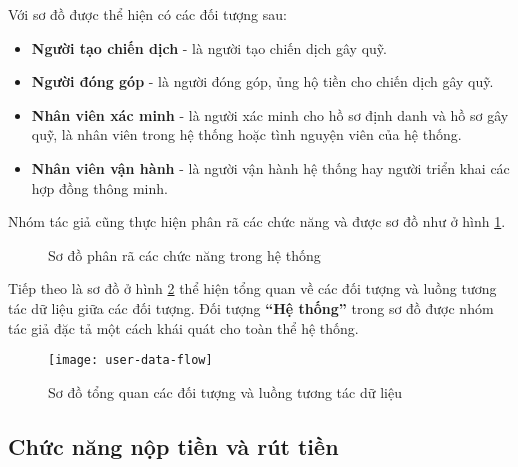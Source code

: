 \documentclass[../main-report.tex]{subfiles}
\begin{document}
Với sơ đồ được thể hiện có các đối tượng sau:

\begin{itemize}
\item \textbf{Người tạo chiến dịch} - là người tạo chiến dịch gây quỹ.
\item \textbf{Người đóng góp} - là người đóng góp, ủng hộ tiền cho chiến dịch gây quỹ.
\item \textbf{Nhân viên xác minh} - là người xác minh cho hồ sơ định danh và hồ sơ gây quỹ, là nhân viên trong hệ thống hoặc tình nguyện viên của hệ thống.
\item \textbf{Nhân viên vận hành} - là người vận hành hệ thống hay người triển khai các hợp đồng thông minh.
\end{itemize}

Nhóm tác giả cũng thực hiện phân rã các chức năng và được sơ đồ như ở hình \ref{fig:function-tree}.

\begin{figure}[ht!]
\begin{center}
\label{fig:function-tree}
\caption{Sơ đồ phân rã các chức năng trong hệ thống}
\end{center}
\end{figure}

Tiếp theo là sơ đồ ở hình \ref{fig:user-data-flow} thể hiện tổng quan về các đối tượng và luồng tương tác dữ liệu giữa các đối tượng. Đối tượng \textbf{``Hệ thống''} trong sơ đồ được nhóm tác giả đặc tả một cách khái quát cho toàn thể hệ thống.

\begin{figure}[ht!]
\begin{center}
\label{fig:user-data-flow}
\texttt{[image: user-data-flow]}
\caption{Sơ đồ tổng quan các đối tượng và luồng tương tác dữ liệu}
\end{center}
\end{figure}

\subsection{Chức năng nộp tiền và rút tiền}
\end{document}
